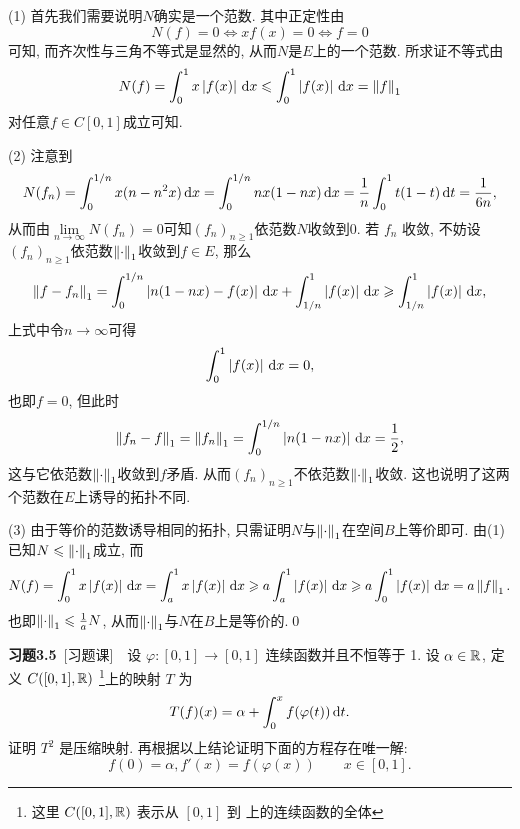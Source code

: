     \begin{Proof}
    (1) 首先我们需要说明$ N $确实是一个范数. 其中正定性由
    \[
    N(f)=0\Longleftrightarrow xf(x)=0\Longleftrightarrow f=0
    \]
    可知, 而齐次性与三角不等式是显然的, 从而$ N $是$ E $上的一个范数. 所求证不等式由
    \[
    N(f)=\int_0^1x\left| f(x) \right| \,\mathrm{d} x\leqslant\int_0^1\left| f(x) \right| \,\mathrm{d} x=\left\| f \right\|_1
    \]
    对任意$ f\in C[0,1] $成立可知.
    
    (2) 注意到
    \[
    N(f_n)=\int_0^{1/n}x(n-n^2x)\,\mathrm{d} x=\int_0^{1/n}nx(1-nx)\,\mathrm{d} x=\frac{1}{n}\int_0^1t(1-t)\,\mathrm{d} t=\frac{1}{6n},
    \]
    从而由$ \lim\limits_{n\to\infty}N(f_n)=0 $可知$ (f_n)_{n\geqslant 1} $依范数$ N $收敛到0. 若 $ f_{n} $ 收敛, 不妨设$ (f_n)_{n\geqslant 1} $依范数$ \left\| \cdot \right\|_1 $收敛到$ f\in E $, 那么
    \[
    \left\| f-f_n \right\|_1=\int_0^{1/n}\left| n(1-nx)-f(x) \right| \,\mathrm{d} x+\int_{1/n}^1\left| f(x) \right| \,\mathrm{d} x\geqslant\int_{1/n}^1\left| f(x) \right| \,\mathrm{d} x,
    \]
    上式中令$ n\to\infty $可得
    \[
    \int_0^1\left| f(x) \right| \,\mathrm{d} x=0,
    \]
    也即$ f=0 $, 但此时
    \[
    \left\| f_n-f \right\|_1=\left\| f_n \right\|_{1}=\int_0^{1/n}\left| n(1-nx) \right| \,\mathrm{d} x=\frac{1}{2},
    \]
    这与它依范数$ \left\| \cdot \right\|_1 $收敛到$ f $矛盾. 从而$ (f_n)_{n\geqslant 1} $不依范数$ \left\| \cdot \right\|_1 $收敛. 这也说明了这两个范数在$ E $上诱导的拓扑不同.
    
    (3) 由于等价的范数诱导相同的拓扑, 只需证明$ N $与$ \left\| \cdot \right\|_1 $在空间$ B $上等价即可. 由(1)已知$ N\leqslant\left\| \cdot \right\|_1 $成立, 而
    \[
    N(f)=\int_0^1x\left| f(x) \right| \,\mathrm{d} x=\int_a^1x\left| f(x) \right| \,\mathrm{d} x\geqslant a\int_a^1\left| f(x) \right| \,\mathrm{d} x\geqslant a\int_0^1\left| f(x) \right| \,\mathrm{d} x=a\left\| f \right\|_1.
    \]
    也即$ \left\| \cdot \right\|_1\leqslant\frac{1}{a}N $, 从而$ \left\| \cdot \right\|_1 $与$ N $在$ B $上是等价的.\qed
    \end{Proof}

    \textbf{习题3.5}\ [习题课]\ \ 设 $ \varphi:[0, 1]\to [0, 1] $ 连续函数并且不恒等于 1. 设 $ \alpha\in\mathbb{R} $, 定义 $ C([0, 1],\mathbb{R}) $ \footnote{这里 $ C([0, 1],\mathbb{R}) $ 表示从 $ [0, 1] $ 到 \R 上的连续函数的全体 }上的映射 $ T $ 为
    \[
        T(f)(x)=\alpha+\int_{0}^{x}f(\varphi(t))\,\mathrm{d} t.
    \]
    证明 $ T^2 $ 是压缩映射. 再根据以上结论证明下面的方程存在唯一解:
    \begin{equation}\label{eq:3.5题公式}
        f(0)=\alpha, f'(x)=f(\varphi(x))\qquad x\in[0, 1].
    \end{equation}

